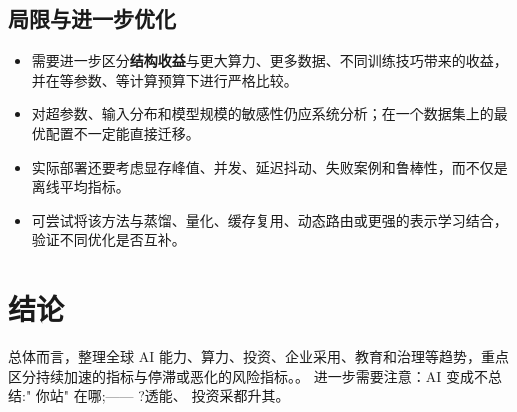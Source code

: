 \documentclass[UTF8,11pt,a4paper]{ctexart}
\newcommand{\term}[1]{\textbf{\textcolor{mainblue}{#1}}}
\begin{document}
\subsection{局限与进一步优化}
\begin{itemize}
\item 需要进一步区分\term{结构收益}与更大算力、更多数据、不同训练技巧带来的收益，并在等参数、等计算预算下进行严格比较。
\item 对超参数、输入分布和模型规模的敏感性仍应系统分析；在一个数据集上的最优配置不一定能直接迁移。
\item 实际部署还要考虑显存峰值、并发、延迟抖动、失败案例和鲁棒性，而不仅是离线平均指标。
\item 可尝试将该方法与蒸馏、量化、缓存复用、动态路由或更强的表示学习结合，验证不同优化是否互补。
\end{itemize}

\section{结论}
总体而言，整理全球 AI 能力、算力、投资、企业采用、教育和治理等趋势，重点区分持续加速的指标与停滞或恶化的风险指标。。 进一步需要注意：AI 变成不总结:" 你站" 在哪;—— ?透能、 投资采都升其。
\end{document}

